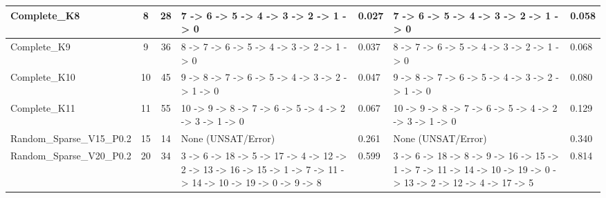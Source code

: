 \documentclass[8pt]{article}
\begin{document}
\begin{longtable}{@{}L{3.2cm} c c L{4cm} L{1.2cm} L{4cm} L{1.2cm}@{}}
\midrule
Complete\_K8 & 8 & 28 & 7 -\textgreater{} 6 -\textgreater{} 5 -\textgreater{} 4 -\textgreater{} 3 -\textgreater{} 2 -\textgreater{} 1 -\textgreater{} 0 & 0.027 & 7 -\textgreater{} 6 -\textgreater{} 5 -\textgreater{} 4 -\textgreater{} 3 -\textgreater{} 2 -\textgreater{} 1 -\textgreater{} 0 & 0.058 \\
\midrule
Complete\_K9 & 9 & 36 & 8 -\textgreater{} 7 -\textgreater{} 6 -\textgreater{} 5 -\textgreater{} 4 -\textgreater{} 3 -\textgreater{} 2 -\textgreater{} 1 -\textgreater{} 0 & 0.037 & 8 -\textgreater{} 7 -\textgreater{} 6 -\textgreater{} 5 -\textgreater{} 4 -\textgreater{} 3 -\textgreater{} 2 -\textgreater{} 1 -\textgreater{} 0 & 0.068 \\
\midrule
Complete\_K10 & 10 & 45 & 9 -\textgreater{} 8 -\textgreater{} 7 -\textgreater{} 6 -\textgreater{} 5 -\textgreater{} 4 -\textgreater{} 3 -\textgreater{} 2 -\textgreater{} 1 -\textgreater{} 0 & 0.047 & 9 -\textgreater{} 8 -\textgreater{} 7 -\textgreater{} 6 -\textgreater{} 5 -\textgreater{} 4 -\textgreater{} 3 -\textgreater{} 2 -\textgreater{} 1 -\textgreater{} 0 & 0.080 \\
\midrule
Complete\_K11 & 11 & 55 & 10 -\textgreater{} 9 -\textgreater{} 8 -\textgreater{} 7 -\textgreater{} 6 -\textgreater{} 5 -\textgreater{} 4 -\textgreater{} 2 -\textgreater{} 3 -\textgreater{} 1 -\textgreater{} 0 & 0.067 & 10 -\textgreater{} 9 -\textgreater{} 8 -\textgreater{} 7 -\textgreater{} 6 -\textgreater{} 5 -\textgreater{} 4 -\textgreater{} 2 -\textgreater{} 3 -\textgreater{} 1 -\textgreater{} 0 & 0.129 \\
\midrule
Random\_Sparse\_V15\_P0.2 & 15 & 14 & None (UNSAT/Error) & 0.261 & None (UNSAT/Error) & 0.340 \\
\midrule
Random\_Sparse\_V20\_P0.2 & 20 & 34 & 3 -\textgreater{} 6 -\textgreater{} 18 -\textgreater{} 5 -\textgreater{} 17 -\textgreater{} 4 -\textgreater{} 12 -\textgreater{} 2 -\textgreater{} 13 -\textgreater{} 16 -\textgreater{} 15 -\textgreater{} 1 -\textgreater{} 7 -\textgreater{} 11 -\textgreater{} 14 -\textgreater{} 10 -\textgreater{} 19 -\textgreater{} 0 -\textgreater{} 9 -\textgreater{} 8 & 0.599 & 3 -\textgreater{} 6 -\textgreater{} 18 -\textgreater{} 8 -\textgreater{} 9 -\textgreater{} 16 -\textgreater{} 15 -\textgreater{} 1 -\textgreater{} 7 -\textgreater{} 11 -\textgreater{} 14 -\textgreater{} 10 -\textgreater{} 19 -\textgreater{} 0 -\textgreater{} 13 -\textgreater{} 2 -\textgreater{} 12 -\textgreater{} 4 -\textgreater{} 17 -\textgreater{} 5 & 0.814 \\
\midrule

\end{longtable}
\end{document}
